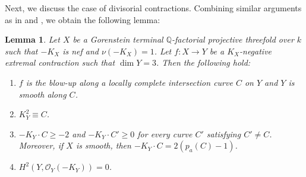 \documentclass[12pt]{amsart}
\def\ge{\geqslant}
\newcommand{\Q}{\mathbb{Q}}
\newcommand{\sO}{\mathcal{O}}
\theoremstyle{plain}
\newtheorem{lem}[thm]{Lemma}
\theoremstyle{definition}
\theoremstyle{remark}
\newtheorem{defn and notation}[thm]{Definition and Notation}
\theoremstyle{plain}
\begin{document}
Next, we discuss the case of divisorial contractions. 
Combining similar arguments as in \cite[Theorem 2.1]{Bauer-Peternell} and \cite[Lemma 2.1]{Xie05}, we obtain the following lemma: 

\begin{lem}\label{lem:nu=1,basic facts}
    Let $X$ be a Gorenstein terminal $\Q$-factorial projective threefold over $k$ such that $-K_X$ is nef and $\nu(-K_X)=1$.
    Let $f\colon X\to Y$ be a $K_X$-negative extremal contraction such that 
    $\dim Y=3$. Then the following hold:
    \begin{enumerate}[label=$(\arabic*)$]
        \item $f$ is the blow-up along a locally complete intersection curve $C$ on $Y$ and $Y$ is smooth along $C$.
        \item $K_Y^2\equiv C$.
        \item $-K_Y\cdot C\ge -2$ and $-K_Y\cdot C'\ge0$ for every curve $C'$ satisfying $C'\neq C$. Moreover, if $X$ is smooth, then $-K_Y\cdot C=2(p_a(C)-1)$.
        \item $H^2(Y,\sO_Y(-K_Y))=0$.
    \end{enumerate}
\end{lem}
\end{document}
